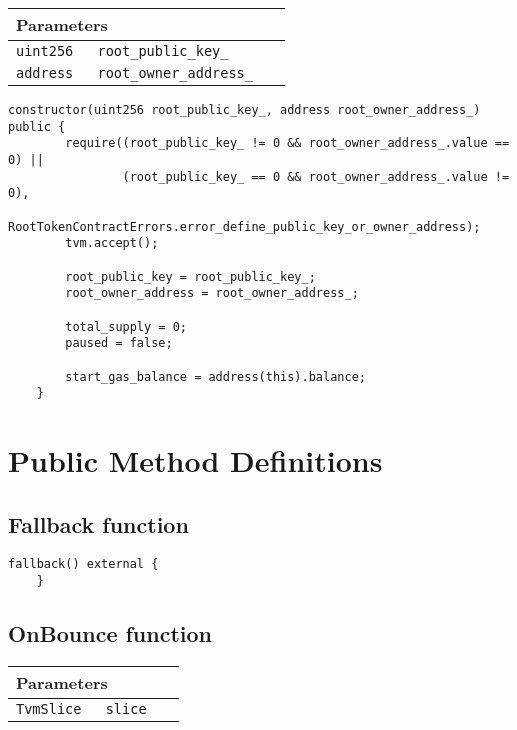 \ifsoltables
\noindent\begin{tabular}{|l|l|p{5cm}|}\hline
\multicolumn{3}{|l|}{\bf Parameters}\\\hline
\tt uint256 & \tt root\_{}public\_{}key\_{} &\\\hline
\tt address & \tt root\_{}owner\_{}address\_{} &\\\hline
\end{tabular}
\fi

\vspace{2cm}

\begin{lstlisting}[firstnumber=48]
    constructor(uint256 root_public_key_, address root_owner_address_) public {
        require((root_public_key_ != 0 && root_owner_address_.value == 0) ||
                (root_public_key_ == 0 && root_owner_address_.value != 0),
                RootTokenContractErrors.error_define_public_key_or_owner_address);
        tvm.accept();

        root_public_key = root_public_key_;
        root_owner_address = root_owner_address_;

        total_supply = 0;
        paused = false;

        start_gas_balance = address(this).balance;
    }
\end{lstlisting}

\section{Public Method Definitions}


\subsection{Fallback function}

\vspace{2cm}

\begin{lstlisting}[firstnumber=523]
    fallback() external {
    }
\end{lstlisting}

\subsection{OnBounce function}


\ifsoltables
\noindent\begin{tabular}{|l|l|p{5cm}|}\hline
\multicolumn{3}{|l|}{\bf Parameters}\\\hline
\tt TvmSlice & \tt slice &\\\hline
\end{tabular}
\fi

